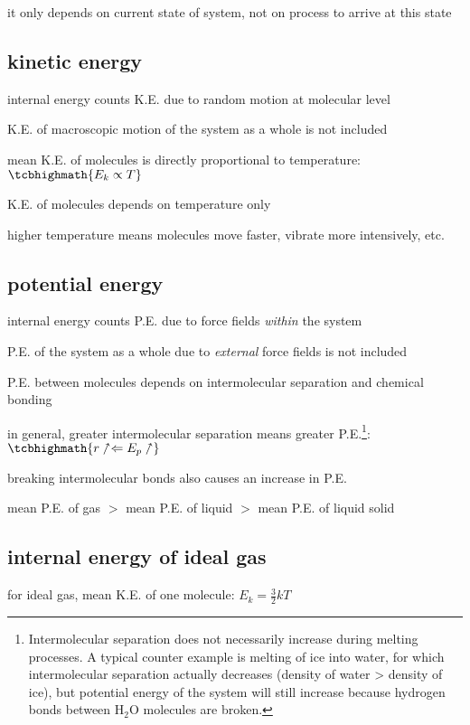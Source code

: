 it only depends on current state of system, not on process to arrive at this state

\subsection{kinetic energy}

\cmt internal energy counts K.E. due to random motion at molecular level

K.E. of macroscopic motion of the system as a whole is not included

\cmt mean K.E. of molecules is directly proportional to temperature: $\tcbhighmath{E_k \propto T}$

K.E. of molecules depends on temperature only

higher temperature means molecules move faster, vibrate more intensively, etc.





\subsection{potential energy}

\cmt internal energy counts P.E. due to force fields \emph{within} the system

P.E. of the system as a whole due to \emph{external} force fields is not included

\cmt P.E. between molecules depends on intermolecular separation and chemical bonding

in general, greater intermolecular separation means greater P.E.\footnote{Intermolecular separation does not necessarily increase during melting processes. A typical counter example is melting of ice into water, for which intermolecular separation actually decreases (density of water > density of ice), but potential energy of the system will still increase because hydrogen bonds between H$_2$O molecules are broken.}: $\tcbhighmath{r \up \Leftarrow E_p \up}$

breaking intermolecular bonds also causes an increase in P.E.

mean P.E. of gas $>$ mean P.E. of liquid $>$ mean P.E. of liquid solid

\subsection{internal energy of ideal gas}

for ideal gas, mean K.E. of one molecule: $E_k = \frac{3}{2}kT$

